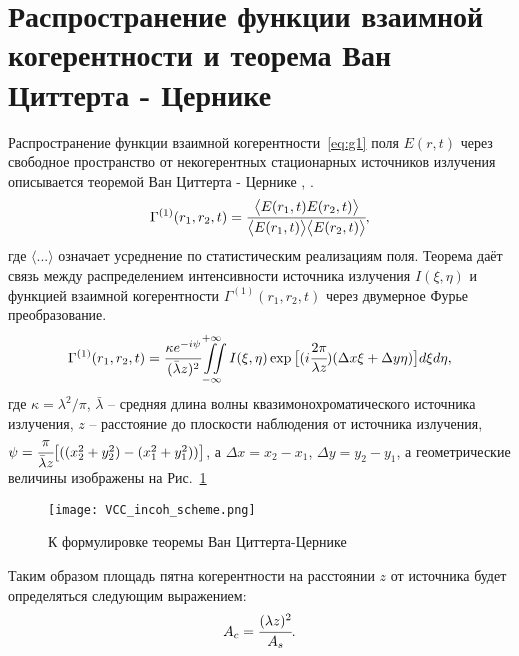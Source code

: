 \section{Распространение функции взаимной когерентности и теорема Ван Циттерта - Цернике}
Распространение функции взаимной когерентности~\ref{eq:g1} поля $E(r, t)$ через свободное пространство от некогерентных стационарных источников излучения описывается теоремой Ван Циттерта - Цернике \cite{van_cittert_wahrscheinliche_1934}, \cite{zernike_concept_1938}. 
\begin{align}
	\Gamma^{(1)} (r_1, r_2, t) = \cfrac{\big \langle {E}(r_1, t) {E}(r_2, t) \big \rangle}{\big \langle {E}(r_1, t)\big \rangle \big \langle{E}(r_2, t) \big \rangle}, 
	\label{eq:g1} 
\end{align}
где $\big \langle ... \big \rangle$ означает усреднение по статистическим реализациям поля. Теорема даёт связь между распределением интенсивности источника излучения $I(\xi, \eta)$ и функцией взаимной когерентности $\Gamma^{(1)} (r_1, r_2, t)$ через двумерное Фурье преобразование. 
\begin{align}
	\Gamma^{(1)} (r_1, r_2, t) = \cfrac{\kappa e^{-i\psi}}{(\bar{\lambda}z)^2} \iint \limits_{-\infty}^{+\infty} I(\xi, \eta) \exp{\big [(i \cfrac{2 \pi}{{\lambda}z}) (\Delta x \xi + \Delta y \eta)\big]}d\xi d\eta, 
	\label{eq:van_cittert_zernike_theorem} 
\end{align}
где $\kappa = {\lambda}^2 / \pi$, $\bar{\lambda}$ -- средняя длина волны квазимонохроматического источника излучения, $z$ -- расстояние до плоскости наблюдения от источника излучения, $\psi = \cfrac{\pi}{\bar{\lambda} z}\big[((x^2_2 + y^2_2) - (x^2_1 + y^2_1)) \big]$, а $\Delta x = x_2 - x_1$, $\Delta y = y_2 - y_1$, а геометрические величины изображены на Рис.~\ref{fig:VCC_scheme_incoh} 
\begin{figure}[H] 
	\centering 	\texttt{[image: VCC\_incoh\_scheme.png]}
	\caption{К формулировке теоремы Ван Циттерта-Цернике}
	\label{fig:VCC_scheme_incoh}
\end{figure}
Таким образом площадь пятна когерентности на расстоянии $z$ от источника будет определяться следующим выражением: 
\begin{align}
	A_c = \cfrac{({\lambda} z)^2}{A_s}.
	\label{eq:VCC}
\end{align}

